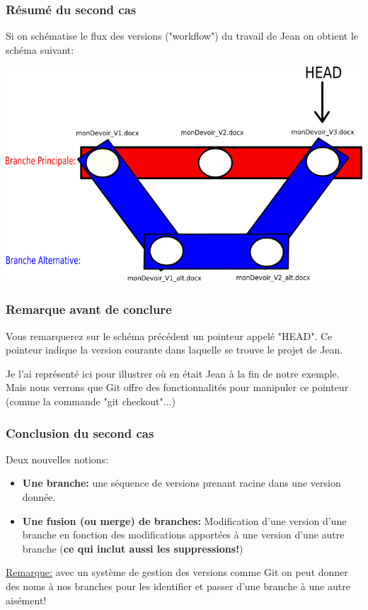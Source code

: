 \documentclass{beamer}
\begin{document}
\begin{frame}
\frametitle{Résumé du second cas}
Si on schématise le flux des versions ("workflow") du travail de Jean on obtient le schéma suivant:

\begin{center}
    \includegraphics[scale=0.4]{images/secondScenario/secondScenario_branches.png}
\end{center}
\end{frame}

\begin{frame}
\frametitle{Remarque avant de conclure}
Vous remarquerez sur le schéma précédent un pointeur appelé "HEAD". Ce pointeur indique la version courante dans laquelle se trouve le projet de Jean.\\
\medskip

Je l'ai représenté ici pour illustrer où en était Jean à la fin de notre exemple. Mais nous verrons que Git offre des fonctionnalités pour manipuler ce pointeur (comme la commande "git checkout"...)\\
\end{frame}

\begin{frame}
\frametitle{Conclusion du second cas}
Deux nouvelles notions:
\begin{itemize}
    \item \textbf{Une branche:} une séquence de versions prenant racine dans une version donnée.
    \item \textbf{Une fusion (ou merge) de branches:} Modification d'une version d'une branche en fonction des modifications apportées à une version d'une autre branche (\textbf{ce qui inclut aussi les suppressions!})
\end{itemize}
\bigskip

\underline{Remarque:} avec un système de gestion des versions comme Git on peut donner des noms à nos branches pour les identifier et passer d'une branche à une autre aisément!
\end{frame}
\end{document}
